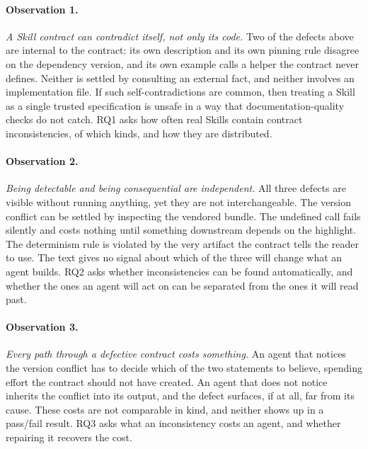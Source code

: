 \paragraph{Observation 1.} \emph{A Skill contract can contradict itself, not only
its code.} Two of the defects above are internal to the contract: its own
description and its own pinning rule disagree on the dependency version, and its
own example calls a helper the contract never defines. Neither is settled by
consulting an external fact, and neither involves an implementation file. If such
self-contradictions are common, then treating a Skill as a single trusted
specification is unsafe in a way that documentation-quality checks do not catch.
RQ1 asks how often real Skills contain contract inconsistencies, of which kinds,
and how they are distributed.

\paragraph{Observation 2.} \emph{Being detectable and being consequential are
independent.} All three defects are visible without running anything, yet they
are not interchangeable. The version conflict can be settled by inspecting the
vendored bundle. The undefined call fails silently and costs nothing until
something downstream depends on the highlight. The determinism rule is violated
by the very artifact the contract tells the reader to use. The text gives no
signal about which of the three will change what an agent builds. RQ2 asks
whether inconsistencies can be found automatically, and whether the ones an agent
will act on can be separated from the ones it will read past.

\paragraph{Observation 3.} \emph{Every path through a defective contract costs
something.} An agent that notices the version conflict has to decide which of the
two statements to believe, spending effort the contract should not have created.
An agent that does not notice inherits the conflict into its output, and the
defect surfaces, if at all, far from its cause. These costs are not comparable in
kind, and neither shows up in a pass/fail result. RQ3 asks what an inconsistency
costs an agent, and whether repairing it recovers the cost.
\endgroup
